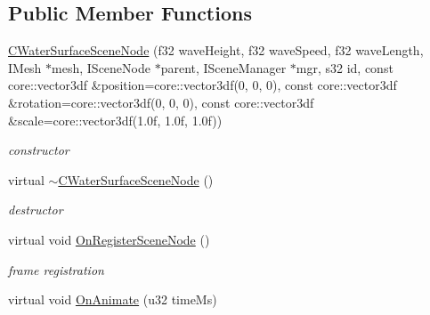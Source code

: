\subsection*{Public Member Functions}
\begin{DoxyCompactItemize}
\item 
\hypertarget{classirr_1_1scene_1_1_c_water_surface_scene_node_a2225bff525fb2e3a588b4493a05e486b}{\hyperlink{classirr_1_1scene_1_1_c_water_surface_scene_node_a2225bff525fb2e3a588b4493a05e486b}{C\-Water\-Surface\-Scene\-Node} (f32 wave\-Height, f32 wave\-Speed, f32 wave\-Length, I\-Mesh $\ast$mesh, I\-Scene\-Node $\ast$parent, I\-Scene\-Manager $\ast$mgr, s32 id, const core\-::vector3df \&position=core\-::vector3df(0, 0, 0), const core\-::vector3df \&rotation=core\-::vector3df(0, 0, 0), const core\-::vector3df \&scale=core\-::vector3df(1.\-0f, 1.\-0f, 1.\-0f))}\label{classirr_1_1scene_1_1_c_water_surface_scene_node_a2225bff525fb2e3a588b4493a05e486b}

\begin{DoxyCompactList}\small\item\em constructor \end{DoxyCompactList}\item 
\hypertarget{classirr_1_1scene_1_1_c_water_surface_scene_node_a2e5adec700bf913a7eb78c64d64efd64}{virtual \hyperlink{classirr_1_1scene_1_1_c_water_surface_scene_node_a2e5adec700bf913a7eb78c64d64efd64}{$\sim$\-C\-Water\-Surface\-Scene\-Node} ()}\label{classirr_1_1scene_1_1_c_water_surface_scene_node_a2e5adec700bf913a7eb78c64d64efd64}

\begin{DoxyCompactList}\small\item\em destructor \end{DoxyCompactList}\item 
virtual void \hyperlink{classirr_1_1scene_1_1_c_water_surface_scene_node_a669dccf4ddfcee7169a9ce4f52bcf9c7}{On\-Register\-Scene\-Node} ()
\begin{DoxyCompactList}\small\item\em frame registration \end{DoxyCompactList}\item 
\hypertarget{classirr_1_1scene_1_1_c_water_surface_scene_node_ab7dd922ea3d4e1c5071a044c1596b318}{virtual void \hyperlink{classirr_1_1scene_1_1_c_water_surface_scene_node_ab7dd922ea3d4e1c5071a044c1596b318}{On\-Animate} (u32 time\-Ms)}\label{classirr_1_1scene_1_1_c_water_surface_scene_node_ab7dd922ea3d4e1c5071a044c1596b318}


\end{DoxyCompactItemize}

